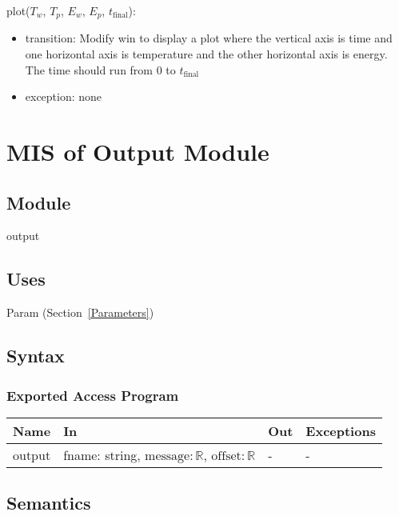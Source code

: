 \documentclass[12pt, titlepage]{article}
\begin{document}
\noindent plot($T_w$, $T_p$, $E_w$, $E_p$, $t_\text{final}$):
\begin{itemize}
\item transition: Modify win to display a plot where the vertical axis
  is time and one horizontal axis is temperature and the other
  horizontal axis is energy.  The time should run from $0$ to $t_\text{final}$
\item exception: none
\end{itemize}

\newpage

\section{MIS of Output Module} \label{Output}

\subsection{Module}

output

\subsection{Uses}

Param (Section~\ref{Parameters})

\subsection{Syntax}

\subsubsection{Exported Access Program}

\begin{center}
\begin{tabular}{p{3cm} p{7cm} p{2cm} p{2cm}}
\hline
\textbf{Name} & \textbf{In} & \textbf{Out} & \textbf{Exceptions} \\
\hline
output & fname: string, $\text{message} : \mathbb{R}$, $\text{offset} : \mathbb{R}$ & - & - \\
\hline
\end{tabular}
\end{center}

\subsection{Semantics}
\end{document}
